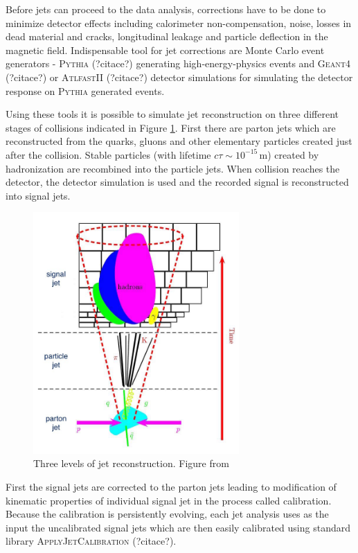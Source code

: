 Before jets can proceed to the data analysis, corrections have to be done to
minimize detector effects including calorimeter non-compensation, noise, losses
in dead material and cracks, longitudinal leakage and particle deflection in the
magnetic field. Indispensable tool for jet corrections are Monte Carlo event
generators - \textsc{Pythia} (?citace?) generating high-energy-physics events and 
\textsc{Geant4} (?citace?) or \textsc{AtlfastII} (?citace?) detector simulations
for simulating the detector response on \textsc{Pythia} generated events.

Using these tools it is possible to simulate jet reconstruction on three
different stages of collisions indicated in Figure \ref{fig:JetPhases}. First
there are parton jets which are reconstructed from the quarks, gluons and other
elementary particles created just after the collision. Stable particles (with
lifetime $c\tau \sim 10^{-15}\,\text{m}$) created by hadronization are recombined into
the particle jets. When collision reaches the detector, the detector simulation
is used and the recorded signal is reconstructed into signal jets.

\begin{figure}
  \centering
  \includegraphics[width=0.7\textwidth]{Chapter2/JetPhases.jpg}
  \caption{Three levels of jet reconstruction. Figure from \cite{DZero:JetEnergyScale} }
  \label{fig:JetPhases}
\end{figure}

First the signal jets are corrected to the parton jets leading to modification
of kinematic properties of individual signal jet in the process called calibration.
Because the calibration is persistently evolving, each jet analysis uses as the
input the uncalibrated signal jets which are then easily calibrated using
standard library \textsc{ApplyJetCalibration} (?citace?).

